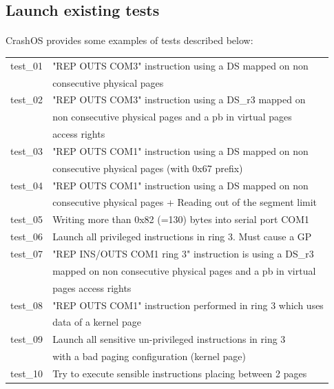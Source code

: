 \documentclass[12pt, openany]{report}
\begin{document}
\subsection*{Launch existing tests}


\paragraph{}CrashOS provides some examples of tests described below:

\setlongtables
\begin{longtable}{|l | l |}
\hline
test\_01 & "REP OUTS COM3" instruction using a DS mapped on non \\
         & consecutive physical pages\\
\hline
test\_02 & "REP OUTS COM3" instruction using a DS\_r3 mapped on \\
         & non consecutive physical pages and a pb in virtual pages\\
         & access rights\\
\hline
test\_03 & "REP OUTS COM1" instruction using a DS mapped on non \\
         & consecutive physical pages (with 0x67 prefix)\\
\hline
test\_04 & "REP OUTS COM1" instruction using a DS mapped on non \\
         & consecutive physical pages + Reading out of the segment limit\\
\hline
test\_05 & Writing more than 0x82 (=130) bytes into serial port COM1\\
\hline
test\_06 & Launch all privileged instructions in ring 3. Must cause a GP\\
\hline
test\_07 & "REP INS/OUTS COM1 ring 3" instruction is using a DS\_r3 \\
         & mapped on non consecutive physical pages and a pb in virtual\\
         & pages access rights\\
\hline
test\_08 & "REP OUTS COM1" instruction performed in ring 3 which uses\\
        & data of a kernel page\\
\hline
test\_09 & Launch all sensitive un-privileged instructions in ring 3 \\
         & with a bad paging configuration (kernel page)\\
\hline
test\_10 & Try to execute sensible instructions placing between 2 pages\\
\hline

\end{longtable}
\end{document}
